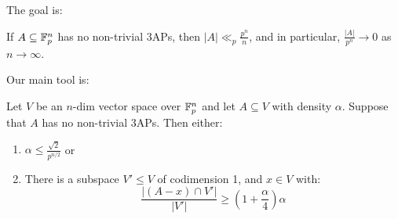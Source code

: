 \documentclass[10pt,a4paper]{article}
\begin{document}
The goal is:
\begin{theorem}[Meshulam, 1957]
  If $A \subseteq \mathbb{F}_p^n$ has no non-trivial 3APs, then $|A|\ll_p \frac{p^n}{n}$, and in particular, $\frac{|A|}{p^n} \to 0$ as $n \to \infty$.
\end{theorem}

Our main tool is:
\begin{lemma}
  Let $V$ be an $n$-dim vector space over $\mathbb{F}_p^n$ and let $A \subseteq V$ with density $\alpha$. Suppose that $A$ has no non-trivial 3APs. Then either:
  \begin{enumerate}
    \item $\alpha \leq \frac{\sqrt{2}}{p^{n/2}}$ or
    \item There is a subspace $V' \leq V$ of codimension 1, and $x \in V$ with:
    \[\frac{|(A-x)\cap V'|}{|V'|} \geq (1+\frac{\alpha}{4})\alpha\]
  \end{enumerate}
\end{lemma}
\end{document}
